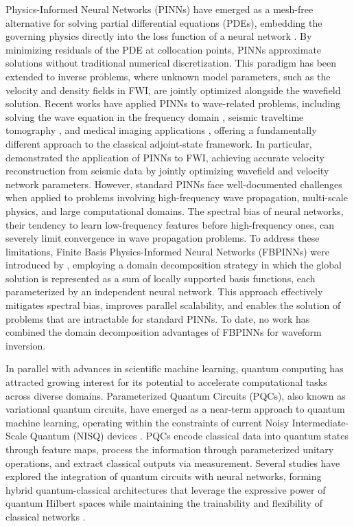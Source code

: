 Physics-Informed Neural Networks (PINNs) have emerged as a mesh-free alternative for solving partial differential equations (PDEs), embedding the governing physics directly into the loss function of a neural network \parencite{RAISSI2019686}. By minimizing residuals of the PDE at collocation points, PINNs approximate solutions without traditional numerical discretization. This paradigm has been extended to inverse problems, where unknown model parameters, such as the velocity and density fields in FWI, are jointly optimized alongside the wavefield solution. Recent works have applied PINNs to wave-related problems, including solving the wave equation in the frequency domain \parencite{10.1093/gji/ggab010}, seismic traveltime tomography \parencite{waheed2021pinntomoseismictomographyusing}, and medical imaging applications \parencite{10230537}, offering a fundamentally different approach to the classical adjoint-state framework. In particular, \parencite{rahst} demonstrated the application of PINNs to FWI, achieving accurate velocity reconstruction from seismic data by jointly optimizing wavefield and velocity network parameters. However, standard PINNs face well-documented challenges when applied to problems involving high-frequency wave propagation, multi-scale physics, and large computational domains. The spectral bias of neural networks, their tendency to learn low-frequency features before high-frequency ones, can severely limit convergence in wave propagation problems. To address these limitations, Finite Basis Physics-Informed Neural Networks (FBPINNs) were introduced by \textcite{Moseley2023}, employing a domain decomposition strategy in which the global solution is represented as a sum of locally supported basis functions, each parameterized by an independent neural network. This approach effectively mitigates spectral bias, improves parallel scalability, and enables the solution of problems that are intractable for standard PINNs.  To date, no work has combined the domain decomposition advantages of FBPINNs for waveform inversion.

In parallel with advances in scientific machine learning, quantum computing has attracted growing interest for its potential to accelerate computational tasks across diverse domains. Parameterized Quantum Circuits (PQCs), also known as variational quantum circuits, have emerged as a near-term approach to quantum machine learning, operating within the constraints of current Noisy Intermediate-Scale Quantum (NISQ) devices \parencite{Preskill2018quantumcomputingin}. PQCs encode classical data into quantum states through feature maps, process the information through parameterized unitary operations, and extract classical outputs via measurement. Several studies have explored the integration of quantum circuits with neural networks, forming hybrid quantum-classical architectures that leverage the expressive power of quantum Hilbert spaces while maintaining the trainability and flexibility of classical networks \parencite{PhysRevA.101.032308, Benedetti_2019, Ostaszewski2021structure}.

